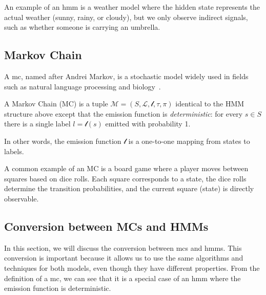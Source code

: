 An example of an \gls{hmm} is a weather model where the hidden state represents the actual weather (sunny, rainy, or cloudy), but we only observe indirect signals, such as whether someone is carrying an umbrella.

\subsection{Markov Chain}\label{subsec:mc}
A \gls{mc}, named after Andrei Markov, is a stochastic model widely used in fields such as natural language processing and biology~\cite{zekri2024large, kim2002can}.
\begin{definition}
    A Markov Chain (MC) is a tuple $\mathcal{M} = (S, \mathcal{L}, \mathscr{l}, \tau,  \pi)$ identical to the HMM structure above except that the emission function is
    \emph{deterministic}: for every $s\in S$ there is a single label
    $l=\mathscr{l}(s)$ emitted with probability 1.
\end{definition}
In other words, the emission function $\mathscr{l}$ is a one-to-one mapping from states to labels.

A common example of an MC is a board game where a player moves between squares based on dice rolls.
Each square corresponds to a state, the dice rolls determine the transition probabilities, and the current square (state) is directly observable.

\subsection{Conversion between MCs and HMMs}\label{subsec:mc_hmm_conversion}
In this section, we will discuss the conversion between \glspl{mc} and \glspl{hmm}.
This conversion is important because it allows us to use the same algorithms and techniques for both models, even though they have different properties.
From the definition of a \gls{mc}, we can see that it is a special case of an \gls{hmm} where the emission function is deterministic.

